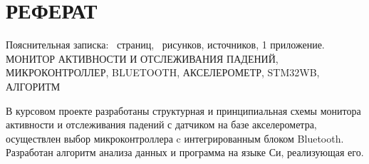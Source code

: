 \begin{sloppypar} %
\newpage %
\section*{РЕФЕРАТ} %

Пояснительная записка: \pageref*{LastPage}~страниц, \totfig~рисунков, источников, 1 приложение.\\

МОНИТОР АКТИВНОСТИ И ОТСЛЕЖИВАНИЯ ПАДЕНИЙ, МИКРОКОНТРОЛЛЕР, BLUETOOTH, АКСЕЛЕРОМЕТР, STM32WB, АЛГОРИТМ



В курсовом проекте разработаны структурная и принципиальная схемы монитора активности и отслеживания падений с датчиком на базе акселерометра, осуществлен выбор микроконтроллера c интегрированным блоком Bluetooth.  Разработан алгоритм анализа данных и программа на языке Си, реализующая его.

\end{sloppypar}
